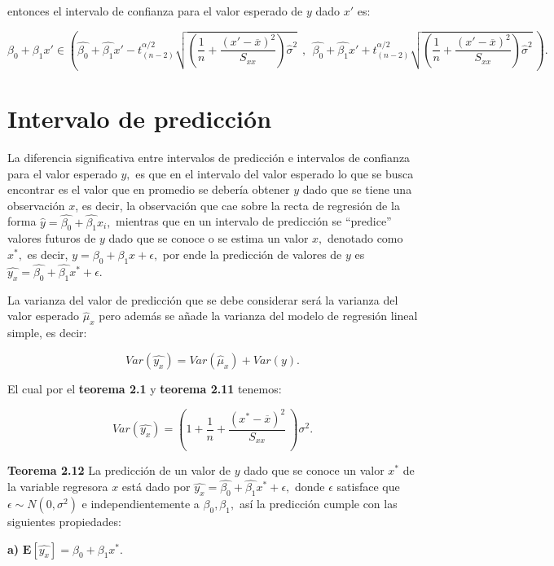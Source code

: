 \documentclass[
  a4paper,
  oneside,
  openany]{book}
\begin{document}
entonces el intervalo de confianza para el valor esperado de \(y\) dado \(x'\) es:

\[\beta_{0}+\beta_{1}x' \in \left(\hat{\beta_{0}}+\hat{\beta_{1}}x'-t_{(n-2)}^{\alpha/2}\sqrt{\left( \frac{1}{n}+\frac{(x'-\overline{x})^2}{S_{xx}}\right)\hat{\sigma}^2} \ \ , \ \ \hat{\beta_{0}}+\hat{\beta_{1}}x'+t_{(n-2)}^{\alpha/2}\sqrt{\left( \frac{1}{n}+\frac{(x'-\overline{x})^2}{S_{xx}}\right)\hat{\sigma}^2} \ \right).\]

\hypertarget{intervalo-de-predicciuxf3n}{%
\section{Intervalo de predicción}\label{intervalo-de-predicciuxf3n}}

La diferencia significativa entre intervalos de predicción e intervalos de confianza para el valor esperado \(y,\) es que en el intervalo del valor esperado lo que se busca encontrar es el valor que en promedio se debería obtener \(y\) dado que se tiene una observación \(x\), es decir, la observación que cae sobre la recta de regresión de la forma \(\hat{y}=\hat{\beta_{0}}+\hat{\beta_{1}}x_{i},\) mientras que en un intervalo de predicción se ``predice'' valores futuros de \(y\) dado que se conoce o se estima un valor \(x,\) denotado como \(x^*,\) es decir, \(y=\beta_{0}+\beta_{1}x+\epsilon,\) por ende la predicción de valores de \(y\) es \(\hat{y_{x}}=\hat{\beta_{0}}+\hat{\beta_{1}}x^*+\epsilon\).

La varianza del valor de predicción que se debe considerar será la varianza del valor esperado \(\hat{\mu}_{x}\) pero además se añade la varianza del modelo de regresión lineal simple, es decir:

\[Var(\hat{y_{x}})=Var(\hat{\mu}_x)+Var(y).\]

El cual por el \textbf{teorema 2.1} y \textbf{teorema 2.11} tenemos:

\[Var(\hat{y_{x}})=\left( 1+ \frac{1}{n}+\frac{(x^*-\overline{x})^2}{S_{xx}} \ \right)\sigma^2.\]

\textbf{Teorema 2.12} La predicción de un valor de \(y\) dado que se conoce un valor \(x^*\) de la variable regresora \(x\) está dado por \(\hat{y_{x}}=\hat{\beta_{0}}+\hat{\beta_{1}}x^*+\epsilon,\) donde \(\epsilon\) satisface que \(\epsilon\sim N(0,\sigma^2)\) e independientemente a \(\beta_{0},\beta_{1},\) así la predicción cumple con las siguientes propiedades:

\textbf{a)} \(\mathbf{E}\left[\hat{y_{x}}\right]=\beta_{0}+\beta_{1}x^*.\)
\end{document}
